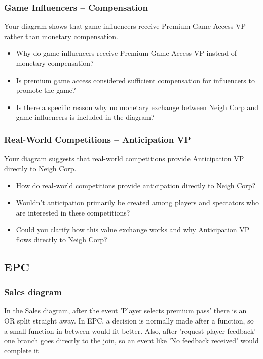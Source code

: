 \documentclass{article}
\begin{document}
\subsubsection*{Game Influencers -- Compensation}

Your diagram shows that game influencers receive Premium Game Access VP rather than monetary compensation.

\begin{itemize}
    \item Why do game influencers receive Premium Game Access VP instead of monetary compensation?
    \item Is premium game access considered sufficient compensation for influencers to promote the game?
    \item Is there a specific reason why no monetary exchange between Neigh Corp and game influencers is included in the diagram?
\end{itemize}

\subsubsection*{Real-World Competitions -- Anticipation VP}

Your diagram suggests that real-world competitions provide Anticipation VP directly to Neigh Corp.

\begin{itemize}
    \item How do real-world competitions provide anticipation directly to Neigh Corp?
    \item Wouldn't anticipation primarily be created among players and spectators who are interested in these competitions?
    \item Could you clarify how this value exchange works and why Anticipation VP flows directly to Neigh Corp?
\end{itemize}

\subsection{EPC}

\subsubsection*{Sales diagram}
In the Sales diagram, after the event 'Player selects premium pass' there is an OR split straight away. In EPC, a decision is normally made after a function, so a small function in between would fit better. Also, after 'request player feedback' one branch goes directly to the join, so an event like 'No feedback received' would complete it
\end{document}
